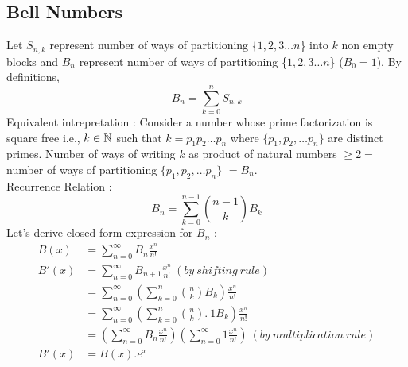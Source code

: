\begin{enumerate}
\subsection{Bell Numbers}
Let $S_{n,k}$ represent number of ways of partitioning \{$1, 2 ,3 \dots n $\} into $k$ non empty blocks and $B_n$ represent number of ways of partitioning \{$1, 2 ,3 \dots n $\} ($B_0 = 1$). By definitions, 
$$B_n = \sum_{k=0}^n S_{n,k}$$
Equivalent intrepretation :  Consider a number whose prime factorization is square free i.e., $k \in \mathbb{N}$ such that $k = p_1p_2 \dots p_n$ where $\{p_1, p_2, \dots p_n\}$ are distinct primes. Number of ways of writing $k$ as product of natural numbers $\geq 2 = $ number of ways of partitioning  $\{p_1, p_2, \dots p_n\}$  $= B_n$. \\
Recurrence Relation : 
 $$ B_n = \sum_{k=0}^{n-1} {{n-1} \choose k} B_k $$ 
 Let's derive closed form expression for $B_n$ :
 \begin{align*}
     B(x) &= \sum_{n=0}^{\infty} B_n \frac{x^n}{n!} \\
     B'(x) &= \sum_{n=0}^{\infty} B_{n+1} \frac{x^n}{n!} ~(by ~ shifting ~rule) \\
     &= \sum_{n=0}^{\infty} (\sum_{k=0}^{n} {n \choose k} B_k) \frac{x^n}{n!} \\
     &= \sum_{n=0}^{\infty} (\sum_{k=0}^{n} {n \choose k}. ~1 B_k) \frac{x^n}{n!} \\
     &= (\sum_{n=0}^{\infty} B_n \frac{x^n}{n!})(\sum_{n=0}^{\infty} 1 \frac{x^n}{n!}) ~(by ~ multiplication ~rule) \\
     B'(x) &= B(x) . e^x \\

\end{align*}
\end{enumerate}
